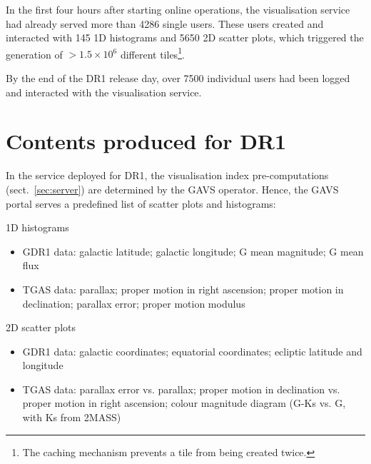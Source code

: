 \documentclass[longauth, final]{aa}
\begin{document}
 In the first four hours after starting online operations, the visualisation service had already served more than 4286 single users. These users created and interacted with 145 1D histograms and 5650 2D scatter plots,   which triggered the generation of $>1.5\times10^6$ different tiles\footnote{The caching mechanism prevents a tile from being created twice.}.



By the end of the DR1 release day, over 7500 individual users had been logged and interacted with the visualisation service.


\section{Contents produced for DR1}
\label{sec:contents}

  
In the service deployed for DR1, the visualisation index pre-computations (sect.~\ref{sec:server}) are determined by the GAVS operator. Hence, the GAVS portal serves a predefined list of scatter plots and histograms:
\begin{description}
    \item 1D histograms
    \begin{itemize}
        \item GDR1 data: galactic latitude; galactic longitude; G mean magnitude; G mean flux
        \item TGAS data: parallax; proper motion in right ascension; proper motion in declination; parallax error; proper motion modulus
    \end{itemize}
    \item 2D scatter plots
    \begin{itemize}
        \item GDR1 data: galactic coordinates; equatorial coordinates; ecliptic latitude and longitude
        \item TGAS data: parallax error vs. parallax; proper motion in declination vs. proper motion in right ascension; colour magnitude diagram (G-Ks vs. G, with Ks from 2MASS)
    \end{itemize}
  \end{description}
\end{document}
